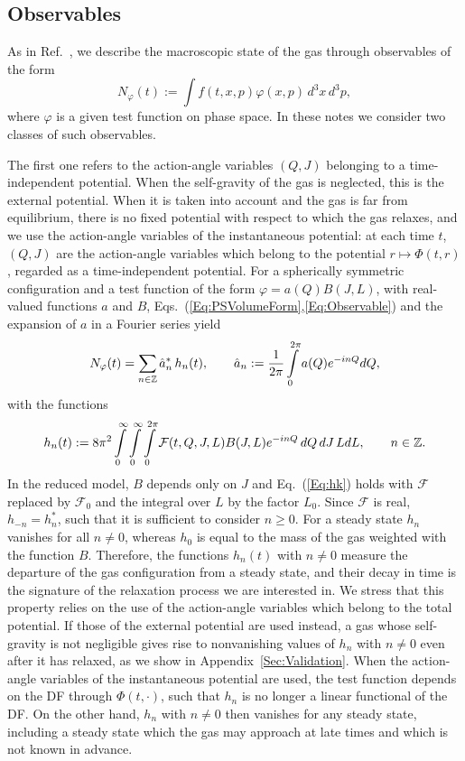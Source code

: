 \subsection{Observables}
\label{SubSec:Observables}

As in Ref.~\cite{pRoS20}, we describe the macroscopic state of the gas through observables of the form
\begin{equation}
N_\varphi(t) := \int f(t,x,p)\varphi(x,p)\, d^3 x\, d^3 p,
\label{Eq:Observable}
\end{equation}
where $\varphi$ is a given test function on phase space. In these notes we consider two classes of such observables.

The first one refers to the action-angle variables $(Q,J)$ belonging to a time-independent potential. When the self-gravity of the gas is neglected, this is the external potential. When it is taken into account and the gas is far from equilibrium, there is no fixed potential with respect to which the gas relaxes, and we use the action-angle variables of the instantaneous potential: at each time $t$, $(Q,J)$ are the action-angle variables which belong to the potential $r\mapsto\Phi(t,r)$, regarded as a time-independent potential. For a spherically symmetric configuration and a test function of the form $\varphi = a(Q) B(J,L)$, with real-valued functions $a$ and $B$, Eqs.~(\ref{Eq:PSVolumeForm},\ref{Eq:Observable}) and the expansion of $a$ in a Fourier series yield
\begin{equation}
N_\varphi(t) = \sum\limits_{n\in\mathbb{Z}} \hat{a}_n^*\, h_n(t),\qquad
\hat{a}_n := \frac{1}{2\pi}\int\limits_0^{2\pi} a(Q) e^{-inQ} dQ,
\label{Eq:NphiSum}
\end{equation}
with the functions
\begin{equation}
h_n(t) := 8\pi^2\int\limits_0^\infty\int\limits_0^\infty\int\limits_0^{2\pi} \mathcal{F}(t,Q,J,L) B(J,L) e^{-inQ}\, dQ\, dJ\, L dL,\qquad n\in\mathbb{Z}.
\label{Eq:hk}
\end{equation}
In the reduced model, $B$ depends only on $J$ and Eq.~(\ref{Eq:hk}) holds with $\mathcal{F}$ replaced by $\mathcal{F}_0$ and the integral over $L$ by the factor $L_0$. Since $\mathcal{F}$ is real, $h_{-n} = h_n^*$, such that it is sufficient to consider $n\geq 0$. For a steady state $h_n$ vanishes for all $n\neq 0$, whereas $h_0$ is equal to the mass of the gas weighted with the function $B$. Therefore, the functions $h_n(t)$ with $n\neq 0$ measure the departure of the gas configuration from a steady state, and their decay in time is the signature of the relaxation process we are interested in. We stress that this property relies on the use of the action-angle variables which belong to the total potential. If those of the external potential are used instead, a gas whose self-gravity is not negligible gives rise to nonvanishing values of $h_n$ with $n\neq 0$ even after it has relaxed, as we show in Appendix~\ref{Sec:Validation}. When the action-angle variables of the instantaneous potential are used, the test function depends on the DF through $\Phi(t,\cdot)$, such that $h_n$ is no longer a linear functional of the DF. On the other hand, $h_n$ with $n\neq 0$ then vanishes for any steady state, including a steady state which the gas may approach at late times and which is not known in advance.

